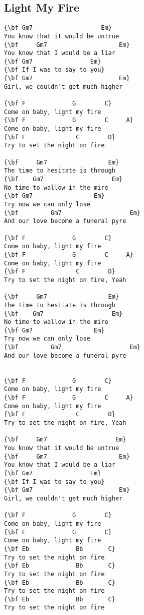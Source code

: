 \documentclass[a4paper]{article}
\begin{document}
\subsection{Light My Fire} %
\label{sub:Light My Fire}
\begin{multicols}{2}
\begin{Verbatim}[commandchars=\\\{\}]
{\bf Gm7                   Em}
You know that it would be untrue
{\bf     Gm7                    Em}
You know that I would be a liar
{\bf Gm7                Em}
{\bf If I was to say to you}
{\bf Gm7                        Em}
Girl, we couldn't get much higher

{\bf F             G        C}
Come on baby, light my fire
{\bf F             G        C     A}
Come on baby, light my fire
{\bf F              C        D}
Try to set the night on fire

{\bf     Gm7                 Em}
The time to hesitate is through
{\bf    Gm7                   Em}
No time to wallow in the mire
{\bf Gm7                 Em}
Try now we can only lose
{\bf         Gm7                   Em}
And our love become a funeral pyre

{\bf F             G        C}
Come on baby, light my fire
{\bf F             G        C     A}
Come on baby, light my fire
{\bf F              C        D}
Try to set the night on fire, Yeah

{\bf     Gm7                 Em}
The time to hesitate is through
{\bf    Gm7                   Em}
No time to wallow in the mire
{\bf Gm7                 Em}
Try now we can only lose
{\bf         Gm7                   Em}
And our love become a funeral pyre


{\bf F             G        C}
Come on baby, light my fire
{\bf F             G        C     A}
Come on baby, light my fire
{\bf F              C        D}
Try to set the night on fire, Yeah

{\bf     Gm7                   Em}
You know that it would be untrue
{\bf     Gm7                    Em}
You know that I would be a liar
{\bf Gm7                Em}
{\bf If I was to say to you}
{\bf Gm7                        Em}
Girl, we couldn't get much higher

{\bf F             G        C}
Come on baby, light my fire
{\bf F             G        C}
Come on baby, light my fire
{\bf Eb             Bb       C}
Try to set the night on fire
{\bf Eb             Bb       C}
Try to set the night on fire
{\bf Eb             Bb       C}
Try to set the night on fire
{\bf Eb             Bb       C}
Try to set the night on fire 
\end{Verbatim}
\end{multicols}
\newpage
\end{document}
